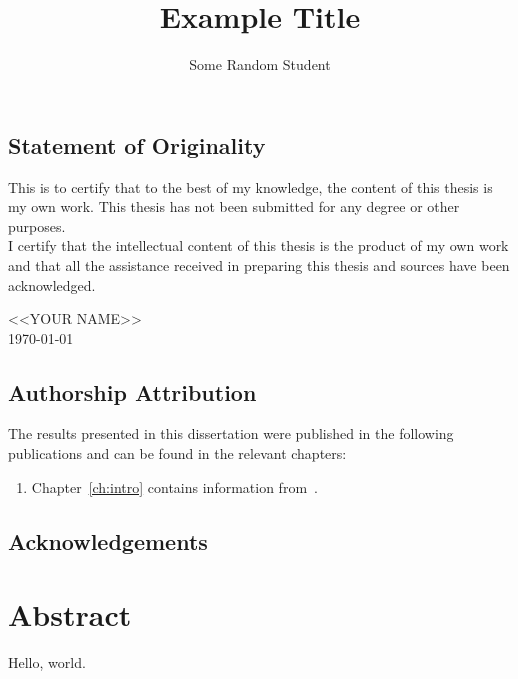 \documentclass[ispdf]{usydthesis}
\title{Example Title}
\author{Some Random Student}
\begin{document}
\pagestyle{empty}
\maketitle

\begin{center}
\section*{Statement of Originality}
\end{center}

This is to certify that to the best of my knowledge, the content of this thesis is my own work. This thesis has not been submitted for any degree or other purposes.\\

\noindent I certify that the intellectual content of this thesis is the product of my own work and that all the assistance received in preparing this thesis and sources have been acknowledged.
\\

\begin{flushright}
\noindent <<YOUR NAME>>\\
\today
\end{flushright}

\newpage
\section*{Authorship Attribution}

%
%

The results presented in this dissertation were published in the following publications and can be found in the relevant chapters:

\begin{enumerate}[label=(\arabic*)]
  \item Chapter~\ref{ch:intro} contains information from~\cite{Nakamoto08-Bitcoin}.
\end{enumerate}

\newpage

\makededication

\section*{\centering Acknowledgements}

\chapter*{Abstract}
\setcounter{page}{5}
Hello, world.
\setcounter{page}{6}
\pagestyle{empty}
\end{document}
